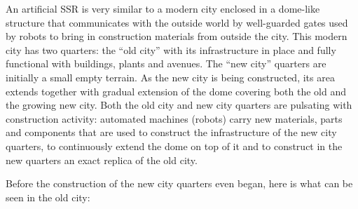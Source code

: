 \documentclass[letterpaper]{article}
\begin{document}
An artificial SSR is very similar to a modern city enclosed in a
dome-like structure that communicates with the outside world by
well-guarded gates used by robots to bring in construction materials
from outside the city. This modern city has two quarters: the “old
city” with its infrastructure in place and fully functional with
buildings, plants and avenues. The “new city” quarters are initially a
small empty terrain. As the new city is being constructed, its area
extends together with gradual extension of the dome covering both the
old and the growing new city. Both the old city and new city quarters
are pulsating with construction activity: automated machines (robots)
carry new materials, parts and components that are used to construct
the infrastructure of the new city quarters, to continuously extend the
dome on top of it and to construct in the new quarters an exact replica
of the old city.


\bigskip

Before the construction of the new city quarters even began, here is
what can be seen in the old city:


\bigskip
\end{document}
